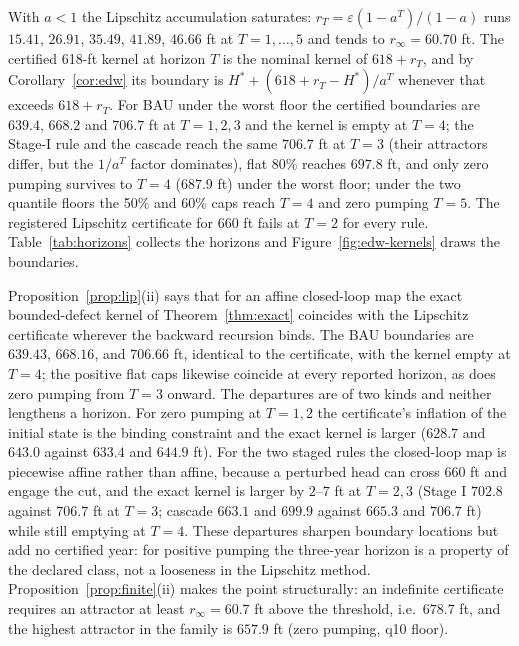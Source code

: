 \documentclass[11pt,a4paper]{article}
\theoremstyle{plain}
\theoremstyle{definition}
\theoremstyle{remark}
\newcommand{\Hstar}{H^{*}}
\begin{document}
With $a<1$ the Lipschitz accumulation saturates: $r_T=\varepsilon(1-a^{T})/(1-a)$ runs $15.41$, $26.91$, $35.49$, $41.89$, $46.66$ ft at $T=1,\dots,5$ and tends to $r_\infty=60.70$ ft. The certified 618-ft kernel at horizon $T$ is the nominal kernel of $618+r_T$, and by Corollary~\ref{cor:edw} its boundary is $\Hstar+(618+r_T-\Hstar)/a^{T}$ whenever that exceeds $618+r_T$. For BAU under the worst floor the certified boundaries are $639.4$, $668.2$ and $706.7$ ft at $T=1,2,3$ and the kernel is empty at $T=4$; the Stage-I rule and the cascade reach the same $706.7$ ft at $T=3$ (their attractors differ, but the $1/a^{T}$ factor dominates), flat 80\% reaches $697.8$ ft, and only zero pumping survives to $T=4$ ($687.9$ ft) under the worst floor; under the two quantile floors the 50\% and 60\% caps reach $T=4$ and zero pumping $T=5$. The registered Lipschitz certificate for 660 ft fails at $T=2$ for every rule. Table~\ref{tab:horizons} collects the horizons and Figure~\ref{fig:edw-kernels} draws the boundaries.

Proposition~\ref{prop:lip}(ii) says that for an affine closed-loop map the exact bounded-defect kernel of Theorem~\ref{thm:exact} coincides with the Lipschitz certificate wherever the backward recursion binds. The BAU boundaries are $639.43$, $668.16$, and $706.66$ ft, identical to the certificate, with the kernel empty at $T=4$; the positive flat caps likewise coincide at every reported horizon, as does zero pumping from $T=3$ onward. The departures are of two kinds and neither lengthens a horizon. For zero pumping at $T=1,2$ the certificate's inflation of the initial state is the binding constraint and the exact kernel is larger ($628.7$ and $643.0$ against $633.4$ and $644.9$ ft). For the two staged rules the closed-loop map is piecewise affine rather than affine, because a perturbed head can cross 660 ft and engage the cut, and the exact kernel is larger by $2$--$7$ ft at $T=2,3$ (Stage I $702.8$ against $706.7$ ft at $T=3$; cascade $663.1$ and $699.9$ against $665.3$ and $706.7$ ft) while still emptying at $T=4$. These departures sharpen boundary locations but add no certified year: for positive pumping the three-year horizon is a property of the declared class, not a looseness in the Lipschitz method. Proposition~\ref{prop:finite}(ii) makes the point structurally: an indefinite certificate requires an attractor at least $r_\infty=60.7$ ft above the threshold, i.e.\ $678.7$ ft, and the highest attractor in the family is $657.9$ ft (zero pumping, q10 floor).
\end{document}
